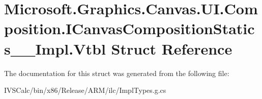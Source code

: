 \hypertarget{struct_microsoft_1_1_graphics_1_1_canvas_1_1_u_i_1_1_composition_1_1_i_canvas_composition_statics_____impl_1_1_vtbl}{}\section{Microsoft.\+Graphics.\+Canvas.\+U\+I.\+Composition.\+I\+Canvas\+Composition\+Statics\+\_\+\+\_\+\+Impl.\+Vtbl Struct Reference}
\label{struct_microsoft_1_1_graphics_1_1_canvas_1_1_u_i_1_1_composition_1_1_i_canvas_composition_statics_____impl_1_1_vtbl}


The documentation for this struct was generated from the following file\+:\begin{DoxyCompactItemize}
\item 
I\+V\+S\+Calc/bin/x86/\+Release/\+A\+R\+M/ilc/Impl\+Types.\+g.\+cs\end{DoxyCompactItemize}
